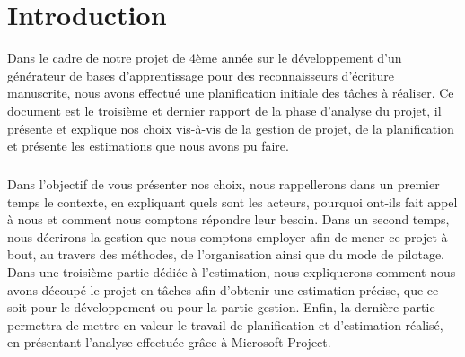 \chapter{Introduction}
\setcounter{page}{1}
\pagestyle{fancy}
\fancyhf{}
\cfoot[\thepage]{\thepage}

Dans le cadre de notre projet de 4ème année sur le développement d’un générateur de bases d’apprentissage pour des reconnaisseurs d’écriture manuscrite, nous avons effectué une planification initiale des tâches à réaliser. Ce document est le troisième et dernier rapport de la phase d’analyse du projet, il présente et explique nos choix vis-à-vis de la gestion de projet, de la planification et présente les estimations que nous avons pu faire.

\paragraph{}
Dans l’objectif de vous présenter nos choix, nous rappellerons dans un premier temps le contexte, en expliquant quels sont les acteurs, pourquoi ont-ils fait appel à nous et comment nous comptons répondre leur besoin. Dans un second temps, nous décrirons la gestion que nous comptons employer afin de mener ce projet à bout, au travers des méthodes, de l’organisation ainsi que du mode de pilotage. Dans une troisième partie dédiée à l’estimation, nous expliquerons comment nous avons découpé le projet en tâches afin d’obtenir une estimation précise, que ce soit pour le développement ou pour la partie gestion. Enfin, la dernière partie permettra de mettre en valeur le travail de planification et d’estimation réalisé, en présentant l’analyse effectuée grâce à Microsoft Project.
